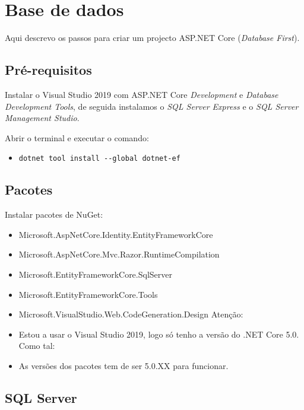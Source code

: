 \chapter{Base de dados}

Aqui descrevo os passos para criar um projecto ASP.NET Core (\textit{Database First}).

\section{Pré-requisitos}

Instalar o Visual Studio 2019 com ASP.NET Core \textit{Development} e \textit{Database  Development Tools}, de seguida instalamos o \textit{SQL Server Express} e o \textit{SQL Server Management Studio}.

Abrir o terminal e executar o comando:

\begin{itemize}

  \item \texttt{dotnet\ tool\ install\ -\/-global\ dotnet-ef}
\end{itemize}

\section{Pacotes}

Instalar pacotes de NuGet:

\begin{itemize}

  \item Microsoft.AspNetCore.Identity.EntityFrameworkCore
  \item Microsoft.AspNetCore.Mvc.Razor.RuntimeCompilation
  \item Microsoft.EntityFrameworkCore.SqlServer
  \item Microsoft.EntityFrameworkCore.Tools
  \item Microsoft.VisualStudio.Web.CodeGeneration.Design Atenção:
  \item Estou a usar o Visual Studio 2019, logo só tenho a versão do .NET Core 5.0. Como tal:
  \item As versões dos pacotes tem de ser 5.0.XX para funcionar.
\end{itemize}

\section{SQL Server}

